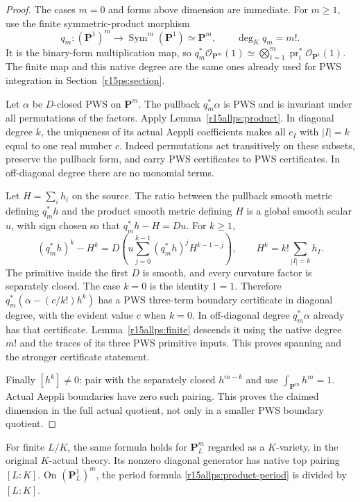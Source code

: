 \begin{proof}
The cases $m=0$ and forms above dimension are immediate.
For $m\geq1$, use the finite symmetric-product morphism
\[
 q_m:(\mathbf P^1)^m\longrightarrow
               \operatorname{Sym}^m(\mathbf P^1)\simeq\mathbf P^m,
                         \qquad\deg_K q_m=m!.
\tag{PA15.8}\label{r15allps:symmetric-cover}
\]
It is the binary-form multiplication map, so
$q_m^*\mathcal O_{\mathbf P^m}(1)
 \simeq\bigotimes_{i=1}^m\operatorname{pr}_i^*
                  \mathcal O_{\mathbf P^1}(1)$.
The finite map and this native degree are the same ones
already used for PWS integration in
Section~\ref{r15ps:section}.

Let $\alpha$ be $D$-closed PWS on $\mathbf P^m$.
The pullback $q_m^*\alpha$ is PWS and is invariant under
all permutations of the factors. Apply
Lemma~\ref{r15allps:product}. In diagonal degree $k$, the
uniqueness of its actual Aeppli coefficients makes all
$c_I$ with $|I|=k$ equal to one real number $c$.
Indeed permutations act transitively on these subsets,
preserve the pullback form, and carry PWS certificates to
PWS certificates. In off-diagonal degree there are no
monomial terms.

Let $H=\sum_i h_i$ on the source. The ratio between the
pullback smooth metric defining $q_m^*h$ and the product
smooth metric defining $H$ is a global smooth scalar $u$,
with sign chosen so that $q_m^*h-H=Du$.
For $k\geq1$,
\[
 (q_m^*h)^k-H^k
   =D\left(u\sum_{j=0}^{k-1}
                    (q_m^*h)^jH^{k-1-j}\right),
       \qquad
 H^k=k!\sum_{|I|=k}h_I.
\tag{PA15.9}\label{r15allps:metric}
\]
The primitive inside the first $D$ is smooth, and every
curvature factor is separately closed. The case $k=0$
is the identity $1=1$. Therefore
$q_m^*(\alpha-(c/k!)h^k)$ has a PWS three-term boundary
certificate in diagonal degree, with the evident value
$c$ when $k=0$. In off-diagonal degree $q_m^*\alpha$
already has that certificate. Lemma~\ref{r15allps:finite}
descends it using the native degree $m!$ and the traces
of its three PWS primitive inputs. This proves spanning
and the stronger certificate statement.

Finally $[h^k]\ne0$: pair with the separately closed
$h^{m-k}$ and use $\int_{\mathbf P^m}h^m=1$.
Actual Aeppli boundaries have zero such pairing.
This proves the claimed dimension in the full actual
quotient, not only in a smaller PWS boundary quotient.
\end{proof}

\begin{corollary}
\label{r15allps:constant-field}
For finite $L/K$, the same formula holds for
$\mathbf P_L^m$ regarded as a $K$-variety, in the original
$K$-actual theory. Its nonzero diagonal generator has native
top pairing $[L:K]$. On $(\mathbf P_L^1)^m$, the period
formula \eqref{r15allps:product-period} is divided by $[L:K]$.
\end{corollary}

